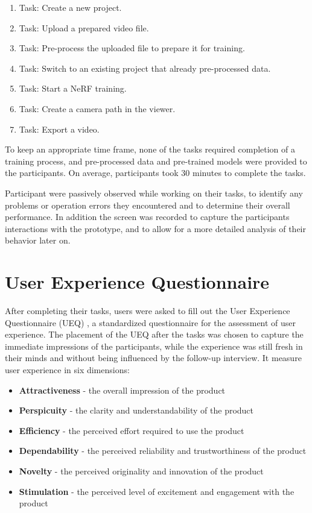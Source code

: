 \begin{enumerate}
  \item Task: Create a new project.
  \item Task: Upload a prepared video file.
  \item Task: Pre-process the uploaded file to prepare it for training.
  \item Task: Switch to an existing project that already pre-processed data.
  \item Task: Start a NeRF training.
  \item Task: Create a camera path in the viewer.
  \item Task: Export a video.
\end{enumerate}

To keep an appropriate time frame, none of the tasks required completion of a training process, and pre-processed data and pre-trained models were provided to the participants.
On average, participants took 30 minutes to complete the tasks.

Participant were passively observed while working on their tasks, to identify any problems or operation errors they encountered and to determine their overall performance.
In addition the screen was recorded to capture the participants interactions with the prototype, and to allow for a more detailed analysis of their behavior later on.

\section{User Experience Questionnaire}
\label{sec:study:ueq}

After completing their tasks, users were asked to fill out the User Experience Questionnaire (UEQ) \cite{laugwitz_construction_2008}, a standardized questionnaire for the assessment of user experience.
The placement of the UEQ after the tasks was chosen to capture the immediate impressions of the participants, while the experience was still fresh in their minds and without being influenced by the follow-up interview.
It measure user experience in six dimensions:

\begin{itemize}
  \item \textbf{Attractiveness} - the overall impression of the product
  \item \textbf{Perspicuity} - the clarity and understandability of the product
  \item \textbf{Efficiency} - the perceived effort required to use the product
  \item \textbf{Dependability} - the perceived reliability and trustworthiness of the product
  \item \textbf{Novelty} - the perceived originality and innovation of the product
  \item \textbf{Stimulation} - the perceived level of excitement and engagement with the product
\end{itemize}

